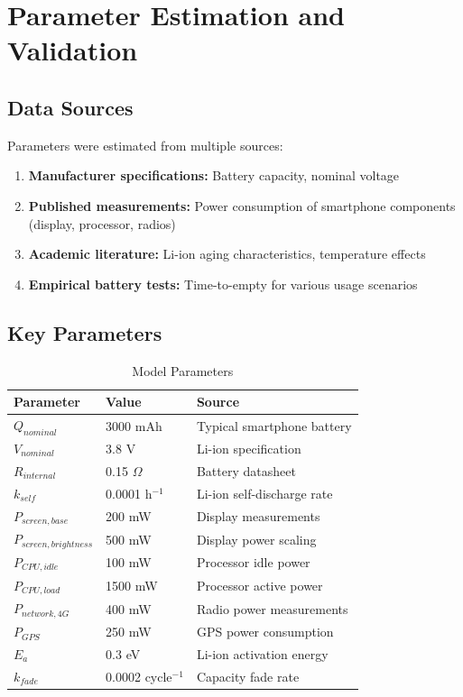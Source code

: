 \documentclass[12pt]{article}
\begin{document}
\section{Parameter Estimation and Validation}

\subsection{Data Sources}

Parameters were estimated from multiple sources:
\begin{enumerate}
\item \textbf{Manufacturer specifications:} Battery capacity, nominal voltage
\item \textbf{Published measurements:} Power consumption of smartphone components (display, processor, radios)
\item \textbf{Academic literature:} Li-ion aging characteristics, temperature effects
\item \textbf{Empirical battery tests:} Time-to-empty for various usage scenarios
\end{enumerate}

\subsection{Key Parameters}

\begin{table}[H]
\centering
\caption{Model Parameters}
\begin{tabular}{lll}
\toprule
\textbf{Parameter} & \textbf{Value} & \textbf{Source} \\
\midrule
$Q_{nominal}$ & 3000 mAh & Typical smartphone battery \\
$V_{nominal}$ & 3.8 V & Li-ion specification \\
$R_{internal}$ & 0.15 $\Omega$ & Battery datasheet \\
$k_{self}$ & 0.0001 h$^{-1}$ & Li-ion self-discharge rate \\
$P_{screen,base}$ & 200 mW & Display measurements \\
$P_{screen,brightness}$ & 500 mW & Display power scaling \\
$P_{CPU,idle}$ & 100 mW & Processor idle power \\
$P_{CPU,load}$ & 1500 mW & Processor active power \\
$P_{network,4G}$ & 400 mW & Radio power measurements \\
$P_{GPS}$ & 250 mW & GPS power consumption \\
$E_a$ & 0.3 eV & Li-ion activation energy \\
$k_{fade}$ & 0.0002 cycle$^{-1}$ & Capacity fade rate \\
\bottomrule
\end{tabular}
\label{tab:parameters}
\end{table}
\end{document}
